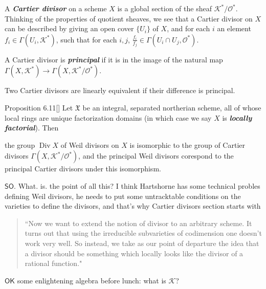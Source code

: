 \begin{defn}\leavevmode
A \textit{\textbf{Cartier divisor}} on a scheme \(X\) is a global section of the sheaf \(\mathcal{K}^*/\mathcal{O}^*\). Thinking of the properties of quotient sheaves, we see that a Cartier divisor on \(X\) can be described by giving an open cover \(\{U_i\}\) of \(X\), and for each \(i\) an element \(f_i \in \Gamma(U_i,\mathcal{K}^*)\), such that for each \(i,j\), \(\frac{f_i}{f_j}\in \Gamma(U_i \cap U_j, \mathcal{O}^*)\).

A Cartier divisor is \textit{\textbf{principal}} if it is in the image of the natural map \(\Gamma(X,\mathcal{K}^*)\to \Gamma(X,\mathcal{K}^*/\mathcal{O}^*)\).

Two Cartier divisors are linearly equivalent if their difference is principal.

\begin{thing6}{Proposition 6.11}[\cite{har}]\label{prop:6.11}\leavevmode
Let \(\mathfrak{X}\) be an integral, separated northerian scheme, all of whose local rings are unique factorization domains (in which case we say \(X\) is \textit{\textbf{locally factorial}}). Then
\begin{tcolorbox}[colback=white,colframe=black,boxrule=0.5pt,sharp corners]
the group \(\operatorname{Div}X\) of Weil divisors on \(X\) is isomorphic to the group of Cartier divisors \(\Gamma(X,\mathcal{K}^*/\mathcal{O}^*)\), and the principal Weil divisors corespond to the principal Cartier divisors under this isomorphism.
\end{tcolorbox}
\end{thing6}
\end{defn}

\(\mathsf{SO}\). What. is. the point of all this? I think Hartshorne has some technical probles defining Weil divisors, he needs to put some untracktable conditions on the varieties to define the divisors, and that's why Cartier divisors section starts with
\begin{quotation}
	``Now we want to extend the notion of divisor to an arbitrary scheme. It turns out that using the irreducible subvarieties of codimension one doesn't work very well. So instead, we take as our point of departure the idea that a divisor should be something which locally looks like the divisor of a rational function."
\end{quotation}

\(\mathsf{OK}\) some enlightening algebra before lunch: what is \(\mathcal{K}\)?


